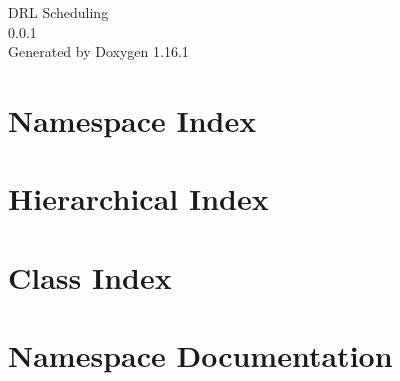 \documentclass[twoside]{book}
\newcommand{\+}{\discretionary{\mbox{\scriptsize$\hookleftarrow$}}{}{}}
\newcommand{\clearemptydoublepage}{%
    \newpage{\pagestyle{empty}\cleardoublepage}%
  }
\begin{document}
  \raggedbottom
    \hypersetup{pageanchor=false,
                bookmarksnumbered=true,
                pdfencoding=unicode
               }
  \begin{titlepage}
  \vspace*{7cm}
  \begin{center}%
  {\Large DRL Scheduling}\\
  [1ex]\large 0.\+0.\+1 \\
  \vspace*{1cm}
  {\large Generated by Doxygen 1.16.1}\\
  \end{center}
  \end{titlepage}
  \clearemptydoublepage
  \tableofcontents
  \clearemptydoublepage
  \hypersetup{pageanchor=true}

\chapter{Namespace Index}

\chapter{Hierarchical Index}

\chapter{Class Index}

\chapter{Namespace Documentation}











\end{document}
